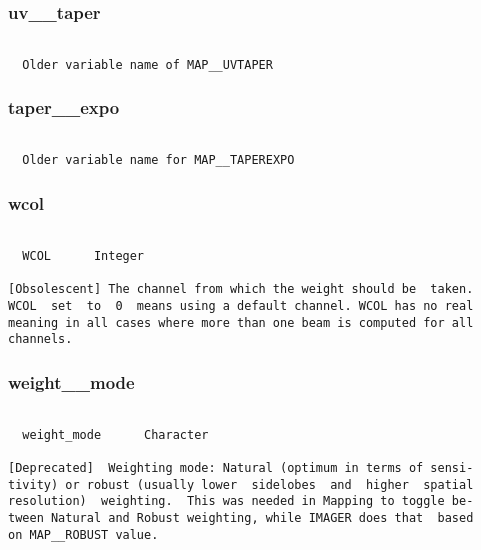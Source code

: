 \subsubsection{uv\_\_taper}
\begin{verbatim}

  Older variable name of MAP__UVTAPER

\end{verbatim}
\subsubsection{taper\_\_expo}
\begin{verbatim}

  Older variable name for MAP__TAPEREXPO

\end{verbatim}
\subsubsection{wcol}
\begin{verbatim}

  WCOL      Integer

[Obsolescent] The channel from which the weight should be  taken.
WCOL  set  to  0  means using a default channel. WCOL has no real
meaning in all cases where more than one beam is computed for all
channels.

\end{verbatim}
\subsubsection{weight\_\_mode}
\begin{verbatim}

  weight_mode      Character

[Deprecated]  Weighting mode: Natural (optimum in terms of sensi-
tivity) or robust (usually lower  sidelobes  and  higher  spatial
resolution)  weighting.  This was needed in Mapping to toggle be-
tween Natural and Robust weighting, while IMAGER does that  based
on MAP__ROBUST value.








































\end{verbatim}
